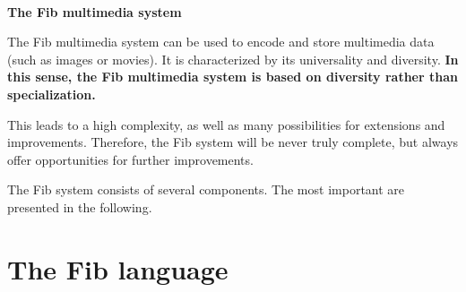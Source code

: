 \documentclass[10pt,a4paper]{article}
\begin{document}






\ \vspace{-2.5cm}
\begin{center}
	\LARGE\bf The Fib multimedia system\\
\end{center}

\bigskip\noindent
The Fib multimedia system can be used to encode and store multimedia data (such as images or movies).
It is characterized by its universality and diversity.
\textbf{In this sense, the Fib multimedia system is based on diversity rather than specialization.}

This leads to a high complexity, as well as many possibilities for extensions and improvements. Therefore, the Fib system will be never truly complete, but always offer opportunities for further improvements.



The Fib system consists of several components. The most important are presented in the following.


\section{The Fib language}
\end{document}
